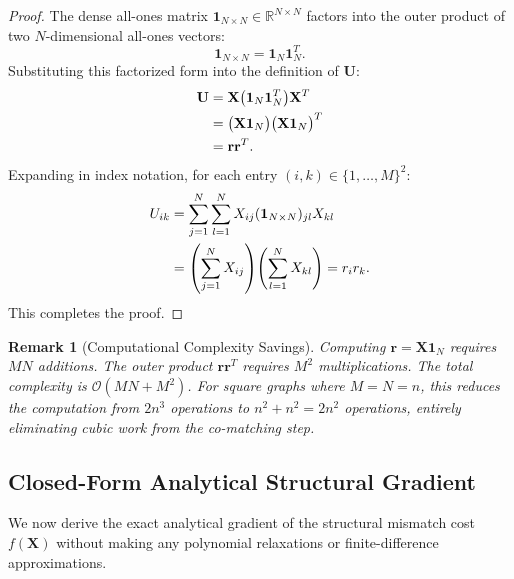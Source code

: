 \documentclass[conference]{IEEEtran}
\newtheorem{remark}{Remark}
\begin{document}
\begin{proof}
The dense all-ones matrix $\mathbf{1}_{N\times N} \in \mathbb{R}^{N\times N}$ factors into the outer product of two $N$-dimensional all-ones vectors:
\begin{equation}
\mathbf{1}_{N\times N} = \mathbf{1}_N \mathbf{1}_N^T.
\end{equation}
Substituting this factorized form into the definition of $\mathbf{U}$:
\begin{align}
\mathbf{U} &= \mathbf{X} \big(\mathbf{1}_N \mathbf{1}_N^T\big) \mathbf{X}^T \notag\\
&= \big(\mathbf{X}\mathbf{1}_N\big) \big(\mathbf{X}\mathbf{1}_N\big)^T \notag\\
&= \mathbf{r} \mathbf{r}^T.
\end{align}
Expanding in index notation, for each entry $(i, k) \in \{1, \ldots, M\}^2$:
\begin{align}
U_{ik} &= \sum_{j=1}^N \sum_{l=1}^N X_{ij} (\mathbf{1}_{N\times N})_{jl} X_{kl} \notag\\
&= \left(\sum_{j=1}^N X_{ij}\right)\!\left(\sum_{l=1}^N X_{kl}\right) = r_i r_k.
\end{align}
This completes the proof.
\end{proof}

\begin{remark}[Computational Complexity Savings]
Computing $\mathbf{r} = \mathbf{X}\mathbf{1}_N$ requires $MN$ additions. The outer product $\mathbf{r}\mathbf{r}^T$ requires $M^2$ multiplications. The total complexity is $\mathcal{O}(MN + M^2)$. For square graphs where $M = N = n$, this reduces the computation from $2n^3$ operations to $n^2 + n^2 = 2n^2$ operations, entirely eliminating cubic work from the co-matching step.
\end{remark}

\subsection{Closed-Form Analytical Structural Gradient}

We now derive the exact analytical gradient of the structural mismatch cost $f(\mathbf{X})$ without making any polynomial relaxations or finite-difference approximations.
\end{document}
